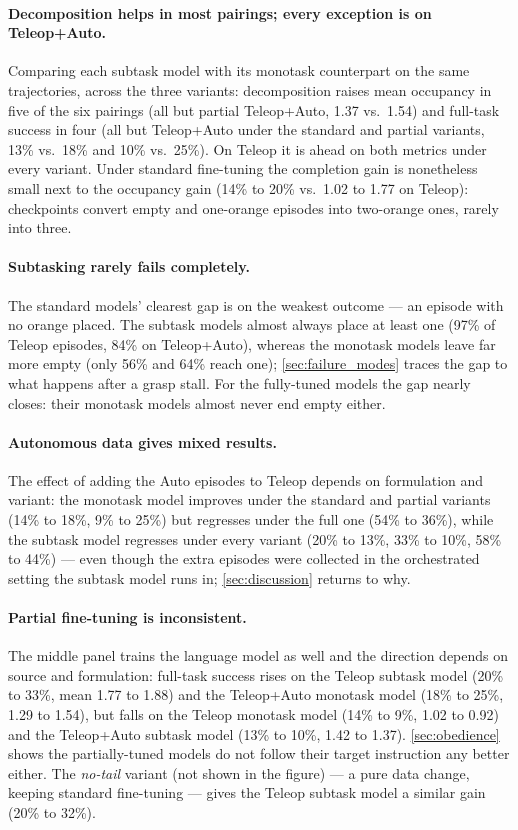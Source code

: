 \paragraph{Decomposition helps in most pairings; every exception is on Teleop+Auto.} Comparing each subtask model with its monotask counterpart on the same trajectories, across the three variants: decomposition raises mean occupancy in five of the six pairings (all but partial Teleop+Auto, 1.37 vs.\ 1.54) and full-task success in four (all but Teleop+Auto under the standard and partial variants, 13\% vs.\ 18\% and 10\% vs.\ 25\%). On Teleop it is ahead on both metrics under every variant. Under standard fine-tuning the completion gain is nonetheless small next to the occupancy gain (14\% to 20\% vs.\ 1.02 to 1.77 on Teleop): checkpoints convert empty and one-orange episodes into two-orange ones, rarely into three.

\paragraph{Subtasking rarely fails completely.} The standard models' clearest gap is on the weakest outcome --- an episode with no orange placed. The subtask models almost always place at least one (97\% of Teleop episodes, 84\% on Teleop+Auto), whereas the monotask models leave far more empty (only 56\% and 64\% reach one); \cref{sec:failure_modes} traces the gap to what happens after a grasp stall. For the fully-tuned models the gap nearly closes: their monotask models almost never end empty either.

\paragraph{Autonomous data gives mixed results.} The effect of adding the Auto episodes to Teleop depends on formulation and variant: the monotask model improves under the standard and partial variants (14\% to 18\%, 9\% to 25\%) but regresses under the full one (54\% to 36\%), while the subtask model regresses under every variant (20\% to 13\%, 33\% to 10\%, 58\% to 44\%) --- even though the extra episodes were collected in the orchestrated setting the subtask model runs in; \cref{sec:discussion} returns to why.

\paragraph{Partial fine-tuning is inconsistent.} The middle panel trains the language model as well and the direction depends on source and formulation: full-task success rises on the Teleop subtask model (20\% to 33\%, mean 1.77 to 1.88) and the Teleop+Auto monotask model (18\% to 25\%, 1.29 to 1.54), but falls on the Teleop monotask model (14\% to 9\%, 1.02 to 0.92) and the Teleop+Auto subtask model (13\% to 10\%, 1.42 to 1.37). \cref{sec:obedience} shows the partially-tuned models do not follow their target instruction any better either. The \emph{no-tail} variant (not shown in the figure) --- a pure data change, keeping standard fine-tuning --- gives the Teleop subtask model a similar gain (20\% to 32\%).

